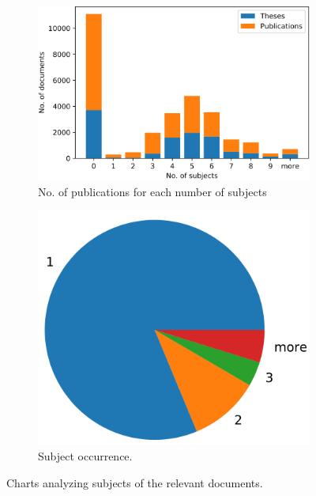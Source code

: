 \begin{figure}
  \begin{subfigure}[t]{0.55\textwidth}
    \centering
    \includegraphics[width=\textwidth]{figures/repository_analysis/subjects_per_document.png}
    \caption{No. of publications for each number of subjects}
    \label{fig:subject_bar}
  \end{subfigure}
  \hfill
  \begin{subfigure}[t]{0.35\textwidth}
    \centering
    \includegraphics[width=\textwidth]{figures/repository_analysis/subject_occurrence.png}
    \caption{Subject occurrence.}
    \label{fig:subject_pie}
  \end{subfigure}
  \caption{Charts analyzing subjects of the relevant documents.}
\end{figure}

